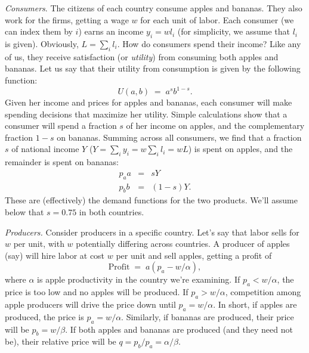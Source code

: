 \documentclass[letterpaper,12pt]{article}
\begin{document}
\textit{Consumers}. The citizens of each country consume apples
and bananas.
They also work for the firms, getting a wage $w$ for each
unit of labor. Each consumer (we can index them by $i$) earns an
income $y_{i} = wl_{i}$ (for simplicity, we assume that $l_{i}$ is
given). Obviously, $L=\sum_{i}l_{i}$. How do consumers spend their
income? Like any of us, they receive satisfaction (or {\it utility\/})
from consuming both apples and bananas.  Let us say that
their utility from consumption is given by the following function:
\[
    U(a,b) \;=\; a^{s}b^{1-s}.
\]
Given her income and prices for apples and bananas, each consumer
will make spending decisions that maximize her utility.
Simple calculations show that a consumer will spend a fraction $s$
of her income on apples, and the complementary fraction $1-s$ on
bananas. Summing across all consumers, we find that a
fraction $s$ of national income $Y$
($Y=\sum_{i}y_{i}=w\sum_{i}l_{i}=wL$) is spent on apples,
and the remainder is spent on bananas:
\begin{eqnarray*}
    p_{a}a &=& s Y  \\
    p_{b}b &=& (1-s)Y.
\end{eqnarray*}
These are (effectively) the demand functions for the two products.
We'll assume below that $s = 0.75$ in both countries.

\textit{Producers.}  Consider producers in a specific country.
Let's say that labor sells for $w$ per unit,
with $w$ potentially differing across countries.
A producer of apples (say) will hire labor at cost $w$ per unit and sell
apples, getting a profit of
\[
    \mbox{Profit} \;=\;  a (p_{a} - w/\alpha) ,
\]
where $\alpha$ is apple productivity in the country we're examining.
If $p_{a} < w/\alpha$, the price is too low and no apples will be
produced. If $p_{a} > w/\alpha$, competition among apple producers
will drive the price down until $p_{a} = w/\alpha$.  In short, if
apples are produced, the price is $p_{a} = w/\alpha$.
Similarly, if bananas are produced, their price will be $p_{b} =
w/\beta$. If both apples and bananas are produced (and they need
not be), their relative price will be $q = p_{b}/p_{a} = \alpha
/\beta $.
\end{document}
